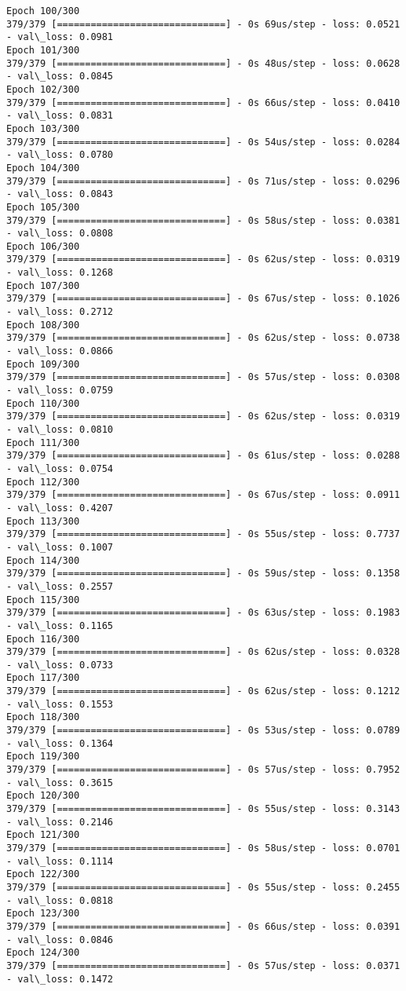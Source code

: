 \documentclass[11pt]{article}
\begin{document}
\begin{Verbatim}[commandchars=\\\{\}]
Epoch 100/300
379/379 [==============================] - 0s 69us/step - loss: 0.0521 - val\_loss: 0.0981
Epoch 101/300
379/379 [==============================] - 0s 48us/step - loss: 0.0628 - val\_loss: 0.0845
Epoch 102/300
379/379 [==============================] - 0s 66us/step - loss: 0.0410 - val\_loss: 0.0831
Epoch 103/300
379/379 [==============================] - 0s 54us/step - loss: 0.0284 - val\_loss: 0.0780
Epoch 104/300
379/379 [==============================] - 0s 71us/step - loss: 0.0296 - val\_loss: 0.0843
Epoch 105/300
379/379 [==============================] - 0s 58us/step - loss: 0.0381 - val\_loss: 0.0808
Epoch 106/300
379/379 [==============================] - 0s 62us/step - loss: 0.0319 - val\_loss: 0.1268
Epoch 107/300
379/379 [==============================] - 0s 67us/step - loss: 0.1026 - val\_loss: 0.2712
Epoch 108/300
379/379 [==============================] - 0s 62us/step - loss: 0.0738 - val\_loss: 0.0866
Epoch 109/300
379/379 [==============================] - 0s 57us/step - loss: 0.0308 - val\_loss: 0.0759
Epoch 110/300
379/379 [==============================] - 0s 62us/step - loss: 0.0319 - val\_loss: 0.0810
Epoch 111/300
379/379 [==============================] - 0s 61us/step - loss: 0.0288 - val\_loss: 0.0754
Epoch 112/300
379/379 [==============================] - 0s 67us/step - loss: 0.0911 - val\_loss: 0.4207
Epoch 113/300
379/379 [==============================] - 0s 55us/step - loss: 0.7737 - val\_loss: 0.1007
Epoch 114/300
379/379 [==============================] - 0s 59us/step - loss: 0.1358 - val\_loss: 0.2557
Epoch 115/300
379/379 [==============================] - 0s 63us/step - loss: 0.1983 - val\_loss: 0.1165
Epoch 116/300
379/379 [==============================] - 0s 62us/step - loss: 0.0328 - val\_loss: 0.0733
Epoch 117/300
379/379 [==============================] - 0s 62us/step - loss: 0.1212 - val\_loss: 0.1553
Epoch 118/300
379/379 [==============================] - 0s 53us/step - loss: 0.0789 - val\_loss: 0.1364
Epoch 119/300
379/379 [==============================] - 0s 57us/step - loss: 0.7952 - val\_loss: 0.3615
Epoch 120/300
379/379 [==============================] - 0s 55us/step - loss: 0.3143 - val\_loss: 0.2146
Epoch 121/300
379/379 [==============================] - 0s 58us/step - loss: 0.0701 - val\_loss: 0.1114
Epoch 122/300
379/379 [==============================] - 0s 55us/step - loss: 0.2455 - val\_loss: 0.0818
Epoch 123/300
379/379 [==============================] - 0s 66us/step - loss: 0.0391 - val\_loss: 0.0846
Epoch 124/300
379/379 [==============================] - 0s 57us/step - loss: 0.0371 - val\_loss: 0.1472

\end{Verbatim}
\end{document}

